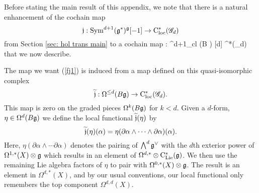 Before stating the main result of this appendix, we note that there is a natural enhancement of the cochain map
\[
\mathfrak j : {\rm Sym}^{d+1} (\mathfrak g^*)^{\mathfrak g} [-1] \to {\rm C}_{\rm loc}^*(\mathscr G_d)
\]
from Section \ref{sec: hol trans main} to a cochain map
\beqn\label{fj1}
\fj : \Omega^{d+1}_{cl} (B \fg) [d] \to \cloc^*(\sG_d)  
\eeqn
that we now describe. 


%


The map we want (\ref{fj1}) is induced from a map defined on this quasi-isomorphic complex
\[
\widetilde{\mathfrak j} : \Omega^{\leq d}(B \mathfrak g) \to {\rm C}_{\rm loc}^*(\mathscr G_d) .
\] 
This map is zero on the graded pieces $\Omega^k (B \mathfrak g)$ for $k < d$. 
Given a $d$-form, $\eta \in \Omega^d(B \mathfrak g)$ we define the local functional $\widetilde{\mathfrak j}(\eta)$ by 
\[
\widetilde{\mathfrak j} (\eta) (\alpha) = \eta (\partial \alpha \wedge \cdots \wedge \partial \alpha) (\alpha) .
\]
Here, $\eta (\partial \alpha \wedge \cdots \partial \alpha)$ denotes the pairing of $\bigwedge^d \mathfrak g^\vee$ with the $d$th exterior power of $\Omega^{1,*}(X) \otimes \mathfrak g$ which results in an element of $\Omega^{d,*} \otimes {\rm C}_{{\rm Lie}}^*(\mathfrak g)$. 
We then use the remaining Lie algebra factors of $\eta$ to pair with $\Omega^{0,*}(X) \otimes \mathfrak g$. 
The result is an element in $\Omega^{d,*}(X)$, and by our usual conventions, our local functional only remembers the top component $\Omega^{d,d}(X)$. 

